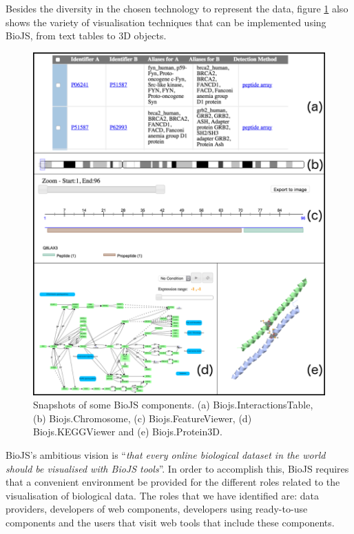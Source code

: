 Besides the diversity in the chosen technology to represent the data, figure \ref{fig:biojs_components} also shows the variety of visualisation techniques that can be implemented using BioJS, from text tables to 3D objects.

\begin{figure}  
\centering
\includegraphics[width=\textwidth]{figures/biojs_components.png}
\caption[Snapshots of some BioJS components.]{Snapshots of some BioJS components. (a) Biojs.InteractionsTable, (b) Biojs.Chromosome, (c) Biojs.FeatureViewer, (d) Biojs.KEGGViewer and  (e) Biojs.Protein3D.
\label{fig:biojs_components}}
\end{figure}
 

BioJS's ambitious vision is ``\emph{that every online biological dataset in the world should be visualised with BioJS tools}''. In order to accomplish this, BioJS requires that a convenient environment be provided for the different roles related to the visualisation of biological data. The roles that we have identified are: data providers,  developers of web components, developers using ready-to-use components and the users that visit web tools that include these components.

